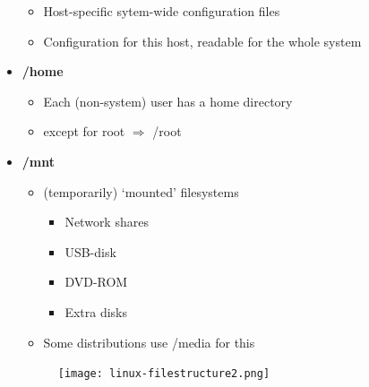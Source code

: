 \documentclass{article}
\begin{document}
\begin{itemize}
\begin{itemize}
        \item Host-specific sytem-wide configuration files
        \item Configuration for this host, readable for the whole system
    \end{itemize}
    \item \textbf{/home}
    \begin{itemize}
        \item Each (non-system) user has a home directory
        \item except for root $\Rightarrow$ /root
    \end{itemize}
    \item \textbf{/mnt}
    \begin{itemize}
        \item (temporarily) `mounted' filesystems
        \begin{itemize}
            \item Network shares
            \item USB-disk
            \item DVD-ROM
            \item Extra disks
        \end{itemize}
        \item Some distributions use /media for this
    \end{itemize}
    \begin{figure}[H]
        \centering
        \texttt{[image: linux-filestructure2.png]}
    \end{figure}
    

\end{itemize}
\end{document}
